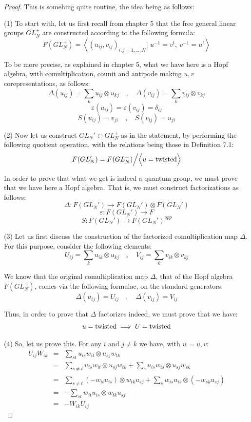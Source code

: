 \documentclass[12pt]{amsbook}
\begin{document}
\begin{proof}
This is somehing quite routine, the idea being as follows:

\medskip

(1) To start with, let us first recall from chapter 5 that the free general linear groups $GL_N^+$ are constructed according to the following formula:
$$F(GL_N^+)=\left<(u_{ij},v_{ij})_{i,j=1,\ldots,N}\,\Big|\,u^{-1}=v^t,\ v^{-1}=u^t\right>$$

To be more precise, as explained in chapter 5, what we have here is a Hopf algebra, with comultiplication, counit and antipode making $u,v$ corepresentations, as follows:
$$\Delta(u_{ij})=\sum_ku_{ij}\otimes u_{kj}\quad,\quad\Delta(v_{ij})=\sum_kv_{ij}\otimes v_{kj}$$
$$\varepsilon(u_{ij})=\varepsilon(v_{ij})=\delta_{ij}$$
$$S(u_{ij})=v_{ji}\quad,\quad S(v_{ij})=u_{ji}$$

(2) Now let us construct $GL_N'\subset GL_N^+$ as in the statement, by performing the following quotient operation, with the relations being those in Definition 7.1:
$$F(GL_N')=F(GL_N^+)\Big/\Big<u={\rm twisted}\Big>$$

In order to prove that what we get is indeed a quantum group, we must prove that we have here a Hopf algebra. That is, we must construct factorizations as follows:
$$\Delta:F(GL_N')\to F(GL_N')\otimes F(GL_N')$$
$$\varepsilon:F(GL_N')\to F$$
$$S:F(GL_N')\to F(GL_N')^{opp}$$

(3) Let us first discuss the construction of the factorized comultiplication map $\Delta$. For this purpose, consider the following elements:
$$U_{ij}=\sum_ku_{ik}\otimes u_{kj}\quad, \quad V_{ij}=\sum_kv_{ik}\otimes v_{kj}$$

We know that the original comultiplication map $\Delta$, that of the Hopf algebra $F(GL_N^+)$, comes via the following formulae, on the standard generators:
$$\Delta(u_{ij})=U_{ij}\quad,\quad\Delta(v_{ij})=V_{ij}$$

Thus, in order to prove that $\Delta$ factorizes indeed, we must prove that we have:
$$u={\rm twisted}\implies U={\rm twisted}$$

(4) So, let us prove this. For any $i$ and $j\neq k$ we have, with $w=u,v$:
\begin{eqnarray*}
U_{ij}W_{ik}
&=&\sum_{st}u_{is}w_{it}\otimes u_{sj}w_{tk}\\
&=&\sum_{s\neq t}u_{is}w_{it}\otimes u_{sj}w_{tk}+\sum_su_{is}w_{is}\otimes u_{sj}w_{sk}\\
&=&\sum_{s\neq t}(-w_{it}u_{is})\otimes w_{tk}u_{sj}+\sum_sw_{is}u_{is}\otimes(-w_{sk}u_{sj})\\
&=&-\sum_{st}w_{it}u_{is}\otimes w_{tk}u_{sj}\\
&=&-W_{ik}U_{ij}
\end{eqnarray*}


\end{proof}
\end{document}
